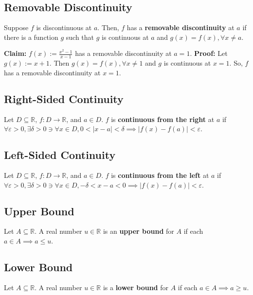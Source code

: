 \documentclass[11pt]{book}
\newcommand{\R}{\mathbb{R}}
\begin{document}
	\subsection{Removable Discontinuity}
	\label{subsec:removablediscontinuity}
		\begin{defin}
			Suppose $f$ is discontinuous at $a$. Then, $f$ has a \textbf{removable discontinuity} at $a$ if there is a function $g$ such that $g$ is continuous
			at $a$ and $g(x) = f(x), \forall x \neq a$.
		\end{defin}
		\begin{examp}
			\textbf{Claim:} $f(x) := \frac{x^2 -1}{x-1}$ has a removable discontinuity at $a = 1$.\hfill \break
			\textbf{Proof:} Let $g(x) := x + 1$. Then $g(x) = f(x), \forall x \neq 1$ and $g$ is continuous at $x = 1$. 
			So, $f$ has a removable discontinuity at $x = 1$.

		\end{examp}
	\newpage
	\subsection{Right-Sided Continuity}
	\label{subsec:rightsidedcontinuity}
		\begin{defin}
			Let $D \subseteq \R$, $f: D \to \R$, and $a \in D$. $f$ is \textbf{continuous from the right} at $a$ if $\forall \varepsilon > 0, \exists \delta > 0 \ni
			\forall x \in D, 0 < | x - a| < \delta \implies |f(x) - f(a)| < \varepsilon$.
		\end{defin}
	\subsection{Left-Sided Continuity}
	\label{subsec:leftsidedcontinuity}
		\begin{defin}
			Let $D \subseteq \R$, $f: D \to \R$, and $a \in D$. $f$ is \textbf{continuous from the left} at $a$ if $\forall \varepsilon > 0, \exists \delta > 0 \ni
			\forall x \in D, -\delta < x - a < 0 \implies |f(x) - f(a) | < \varepsilon$.
		\end{defin}
	\subsection{Upper Bound}
	\label{subsec:upperbound}
		\begin{defin}
			Let $A \subseteq \R$. A real number $u \in \R$ is an \textbf{upper bound} for $A$ if each $a \in A \implies a \leq u$.
		\end{defin}
	\subsection{Lower Bound}
	\label{subsec:lowerbound}
		\begin{defin}
			Let $A  \subseteq \R$. A real number $u \in \R$ is a \textbf{lower bound} for $A$ if each $a \in A \implies a \geq u$. 
		\end{defin}
\end{document}
